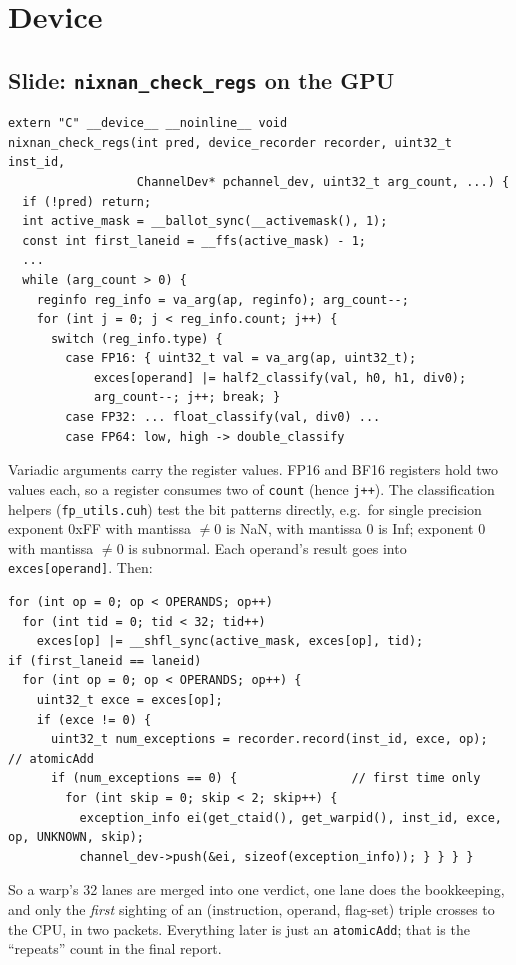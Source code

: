 \documentclass[11pt]{article}
\newcommand{\slide}[1]{\subsection*{Slide: #1}\addcontentsline{toc}{subsection}{#1}}
\begin{document}
\section{Device}
\slide{\texttt{nixnan\_check\_regs} on the GPU}
\begin{lstlisting}
extern "C" __device__ __noinline__ void
nixnan_check_regs(int pred, device_recorder recorder, uint32_t inst_id,
                  ChannelDev* pchannel_dev, uint32_t arg_count, ...) {
  if (!pred) return;
  int active_mask = __ballot_sync(__activemask(), 1);
  const int first_laneid = __ffs(active_mask) - 1;
  ...
  while (arg_count > 0) {
    reginfo reg_info = va_arg(ap, reginfo); arg_count--;
    for (int j = 0; j < reg_info.count; j++) {
      switch (reg_info.type) {
        case FP16: { uint32_t val = va_arg(ap, uint32_t);
            exces[operand] |= half2_classify(val, h0, h1, div0);
            arg_count--; j++; break; }
        case FP32: ... float_classify(val, div0) ...
        case FP64: low, high -> double_classify
\end{lstlisting}
Variadic arguments carry the register values. FP16 and BF16 registers hold two values each, so a register consumes two of \texttt{count} (hence \texttt{j++}). The classification helpers (\texttt{fp\_utils.cuh}) test the bit patterns directly, e.g.\ for single precision exponent 0xFF with mantissa $\neq 0$ is NaN, with mantissa 0 is Inf; exponent 0 with mantissa $\neq 0$ is subnormal. Each operand's result goes into \texttt{exces[operand]}. Then:
\begin{lstlisting}
for (int op = 0; op < OPERANDS; op++)
  for (int tid = 0; tid < 32; tid++)
    exces[op] |= __shfl_sync(active_mask, exces[op], tid);
if (first_laneid == laneid)
  for (int op = 0; op < OPERANDS; op++) {
    uint32_t exce = exces[op];
    if (exce != 0) {
      uint32_t num_exceptions = recorder.record(inst_id, exce, op);  // atomicAdd
      if (num_exceptions == 0) {                // first time only
        for (int skip = 0; skip < 2; skip++) {
          exception_info ei(get_ctaid(), get_warpid(), inst_id, exce, op, UNKNOWN, skip);
          channel_dev->push(&ei, sizeof(exception_info)); } } } }
\end{lstlisting}
So a warp's 32 lanes are merged into one verdict, one lane does the bookkeeping, and only the \emph{first} sighting of an (instruction, operand, flag-set) triple crosses to the CPU, in two packets. Everything later is just an \texttt{atomicAdd}; that is the ``repeats'' count in the final report.
\end{document}
